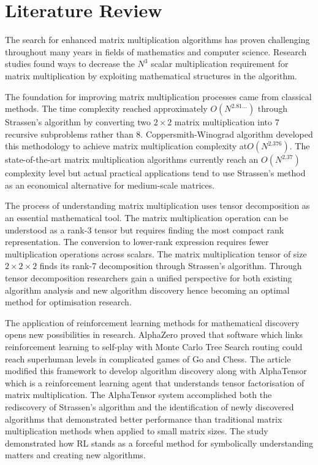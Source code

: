 \documentclass{article}
\begin{document}
\section{Literature Review}
The search for enhanced matrix multiplication algorithms has proven challenging throughout many years in fields of mathematics and computer science. Research studies found ways to decrease the \( N^3 \) scalar multiplication requirement for matrix multiplication by exploiting mathematical structures in the algorithm.

The foundation for improving matrix multiplication processes came from classical methods. The time complexity reached approximately \( O(N^{2.81\ldots}) \) through Strassen's algorithm by converting two \( 2 \times 2 \) matrix multiplication into 7 recursive subproblems rather than 8. 
Coppersmith-Winograd algorithm developed this methodology to achieve matrix multiplication complexity at\(  O(N^{2.376}) \). The state-of-the-art matrix multiplication algorithms currently reach an \( O(N^{2.37}) \) complexity level but actual practical applications tend to use Strassen's method as an economical alternative for medium-scale matrices.

The process of understanding matrix multiplication uses tensor decomposition as an essential mathematical tool. The matrix multiplication operation can be understood as a rank-3 tensor but requires finding the most compact rank representation. The conversion to lower-rank expression requires fewer multiplication operations across scalars. The matrix multiplication tensor of size \( 2 \times 2 \times 2 \) finds its rank-7 decomposition through Strassen's algorithm. Through tensor decomposition researchers gain a unified perspective for both existing algorithm analysis and new algorithm discovery hence becoming an optimal method for optimisation research.

The application of reinforcement learning methods for mathematical discovery opens new possibilities in research. AlphaZero proved that software which links reinforcement learning to self-play with Monte Carlo Tree Search routing could reach superhuman levels in complicated games of Go and Chess. The article modified this framework to develop algorithm discovery along with AlphaTensor which is a reinforcement learning agent that understands tensor factorisation of matrix multiplication. The AlphaTensor system accomplished both the rediscovery of Strassen's algorithm and the identification of newly discovered algorithms that demonstrated better performance than traditional matrix multiplication methods when applied to small matrix sizes. 
The study demonstrated how RL stands as a forceful method for symbolically understanding matters and creating new algorithms.
\end{document}
